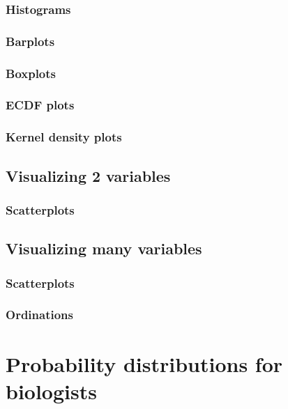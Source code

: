 \documentclass[
  13,
  letterpaper,
]{report}
\begin{document}
\subsection{Histograms}\label{sec-08-sing-hist}

\subsection{Barplots}\label{sec-08-sing-bar}

\subsection{Boxplots}\label{sec-08-sing-box}

\subsection{ECDF plots}\label{sec-08-sing-cdf}

\subsection{Kernel density plots}\label{sec-08-sing-kern}

\section{Visualizing 2 variables}\label{sec-08-two}

\subsection{Scatterplots}\label{sec-08-two-scatter}

\section{Visualizing many variables}\label{sec-08-many}

\subsection{Scatterplots}\label{sec-08-many-pair}

\subsection{Ordinations}\label{sec-08-many-ord}

\chapter{Probability distributions for biologists}\label{sec-09}
\end{document}
